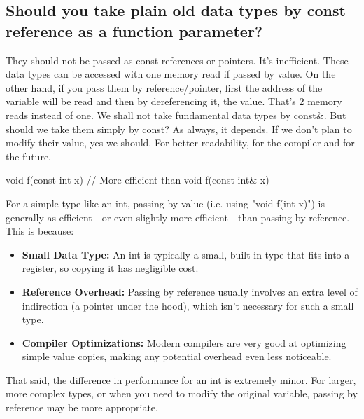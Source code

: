 \documentclass{report}
\begin{document}
\bigbreak \noindent 
\subsection{Should you take plain old data types by const reference as a function parameter?}
\bigbreak \noindent 
They should not be passed as const references or pointers. It’s
inefficient. These data types can be accessed with one memory
read if passed by value. On the other hand, if you pass them by
reference/pointer, first the address of the variable will be read and
then by dereferencing it, the value. That’s 2 memory reads instead
of one.
\bigbreak \noindent 
We shall not take fundamental data types by const\&.
\bigbreak \noindent 
But should we take them simply by const? As always, it depends. If we don’t plan to modify their value, yes we should. For better readability, for the compiler and for the future.
\bigbreak \noindent 
\begin{cppcode}
    void f(const int x) { }
    // More efficient than 
    void f(const int& x) {}
\end{cppcode}
\bigbreak \noindent 
For a simple type like an int, passing by value (i.e. using "void f(int x)") is generally as efficient—or even slightly more efficient—than passing by reference. This is because:
\bigbreak \noindent 
\begin{itemize}
    \item \textbf{Small Data Type:} An int is typically a small, built-in type that fits into a register, so copying it has negligible cost.
    \item \textbf{Reference Overhead:} Passing by reference usually involves an extra level of indirection (a pointer under the hood), which isn’t necessary for such a small type.
    \item \textbf{Compiler Optimizations:} Modern compilers are very good at optimizing simple value copies, making any potential overhead even less noticeable.
\end{itemize}
That said, the difference in performance for an int is extremely minor. For larger, more complex types, or when you need to modify the original variable, passing by reference may be more appropriate.

\pagebreak 
{}
\bigbreak \noindent 
\end{document}
